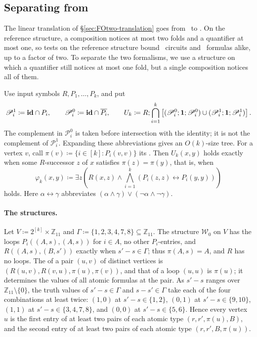 \subsection{Separating \texorpdfstring{{\boldmath\CoR}}{CoR} from
 \texorpdfstring{{\boldmath\FOtwo}}{FO2}}\label{sec:reverse}
The linear translation of \S\ref{sec:FOtwo-translation} goes from \FOtwo\ to \CoR. On the reference
structure, a composition notices at most two folds and a quantifier at
most one, so tests on the reference structure bound \CoR\ circuits and
\FOtwo\ formulas alike, up to a factor of two. To separate the two
formalisms, we use a structure on which a quantifier still notices at
most one fold, but a single composition notices all of them.

Use input symbols $R,P_1,\ldots,P_k$, and put
\[
 \mathscr P_i^1\coloneqq\mathbf{id}\cap P_i,\qquad \mathscr P_i^0\coloneqq\mathbf{id}\cap\overline{P_i},\qquad
 U_k\coloneqq R;\bigcap_{i=1}^k
 \left[(\mathscr P_i^0;\mathbf{1};\mathscr P_i^0)\cup(\mathscr P_i^1;\mathbf{1};\mathscr P_i^1)\right].
\]
The complement in $\mathscr P_i^0$ is taken before intersection with the identity;
it is not the complement of $\mathscr P_i^1$. Expanding these abbreviations gives
an $O(k)$-size tree. For a vertex $v$, call
$\pi(v)\coloneqq\{i\in[k]:P_i(v,v)\}$ its . Then
$U_k(x,y)$ holds exactly when some $R$-successor $z$ of $x$ satisfies
$\pi(z)=\pi(y)$, that is, when
\[
 \varphi_k(x,y)\coloneqq\exists z\left(R(x,z)\land
     \bigwedge_{i=1}^k(P_i(z,z)\leftrightarrow P_i(y,y))\right)
\]
holds. Here $\alpha\leftrightarrow\gamma$ abbreviates
$(\alpha\land\gamma)\lor(\neg\alpha\land\neg\gamma)$.

\paragraph{The structures.}
Let $V\coloneqq2^{[k]}\times\mathbb Z_{11}$ and
$\Gamma\coloneqq\{1,2,3,4,7,8\}\subseteq\mathbb Z_{11}$. The structure
$\mathcal W_0$ on $V$ has the loops $P_i((A,s),(A,s))$ for $i\in A$, no
other $P_i$-entries, and $R((A,s),(B,s'))$ exactly when $s'-s\in\Gamma$;
thus $\pi(A,s)=A$, and $R$ has no loops. The  of a pair
$(u,v)$ of distinct vertices is $(R(u,v),R(v,u),\pi(u),\pi(v))$, and that
of a loop $(u,u)$ is $\pi(u)$; it determines the values of all atomic
formulas at the pair. As $s'-s$ ranges over
$\mathbb Z_{11}\setminus\{0\}$, the truth values of $s'-s\in\Gamma$ and
$s-s'\in\Gamma$ take each of the four combinations at least twice:
$(1,0)$ at $s'-s\in\{1,2\}$, $(0,1)$ at $s'-s\in\{9,10\}$, $(1,1)$ at
$s'-s\in\{3,4,7,8\}$, and $(0,0)$ at $s'-s\in\{5,6\}$. Hence every
vertex $u$ is the first entry of at least two pairs of each atomic type
$(r,r',\pi(u),B)$, and the second entry of at least two pairs of each
atomic type $(r,r',B,\pi(u))$.

